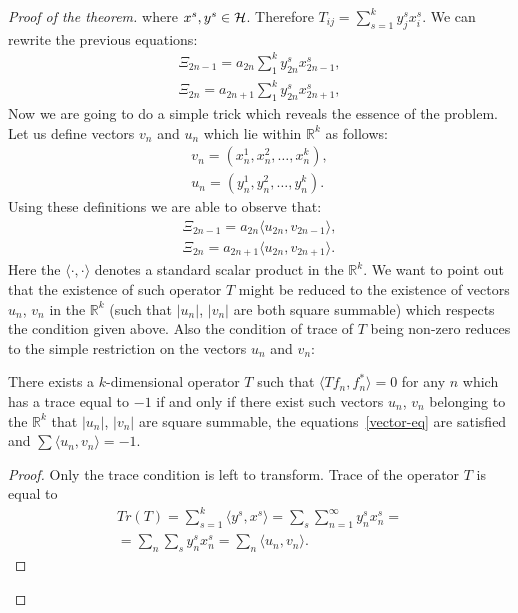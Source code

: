 \begin{proof}[Proof of the theorem]
      where $x^s, y^s \in \cal{H}$.
    Therefore $T_{ij} = \sum_{s=1}^k {y^s_j x^s_i}$.
    We can rewrite the previous equations:
    \begin{align*}
      \Xi_{2n-1} = a_{2n} \sum_1^k y^s_{2n} x^s_{2n - 1},\\
      \Xi_{2n} = a_{2n + 1} \sum_1^k y^s_{2n} x^s_{2n + 1},
    \end{align*}
    Now we are going to do a simple trick which reveals the essence of the problem.
    Let us define vectors $v_n$ and $u_n$ which lie within $\mathbb{R}^k$ as follows:
    \begin{align*}
      v_n = (x^1_n, x^2_n, \dots ,x^k_n),\\
      u_n = (y^1_n, y^2_n, \dots ,y^k_n). 
    \end{align*}
    Using these definitions we are able to observe that:
    \begin{align}
      \label{vector-eq}
      \Xi_{2n-1} = a_{2n} \langle u_{2n}, v_{2n - 1}\rangle,\\
      \Xi_{2n} = a_{2n + 1} \langle u_{2n}, v_{2n + 1}\rangle.
    \end{align}
    Here the $\langle\cdot, \cdot\rangle$ denotes a standard scalar product in the $\mathbb{R}^k$.
    We want to point out that the existence of such operator $T$
      might be reduced to the existence of vectors $u_n$, $v_n$ in the $\mathbb{R}^k$ (such that $|u_n|$, $|v_n|$ are both square summable) which respects the condition given above.
    Also the condition of trace of $T$ being non-zero reduces to the simple restriction on the vectors $u_n$ and $v_n$:
    \begin{prop}
      There exists a $k$-dimensional operator $T$ such that $\langle Tf_n, f_n^*\rangle  = 0$ for any $n$
      which has a trace equal to $-1$ if and only if there exist such vectors $u_n$, $v_n$ belonging to the
      $\mathbb{R}^k$ that $|u_n|$, $|v_n|$ are square summable, the equations~\eqref{vector-eq} are satisfied and
      $\sum \langle u_n,v_n \rangle = -1$. 
    \end{prop}
    \begin{proof}
      Only the trace condition is left to transform.
      Trace of the operator $T$ is equal to
      \begin{multline*}
        Tr(T) = \sum_{s=1}^k \langle y^s, x^s \rangle = \sum_s \sum_{n=1}^\infty y^s_n x^s_n =\\
              = \sum_n \sum_s y^s_n x^s_n = \sum_n \langle u_n, v_n \rangle.
      \end{multline*}

\end{proof}
\end{proof}
